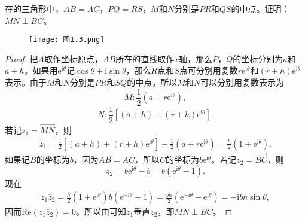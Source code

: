 \documentclass[../../main.tex]{subfiles}
\begin{document}
\begin{example}
在的三角形中，\(AB = AC\)，\(PQ = RS\)，\(M\)和\(N\)分别是\(PR\)和\(QS\)的中点。证明：\(MN \perp BC\)。
\begin{figure}[H]
\centering
\texttt{[image: 图1.3.png]}
\caption{}
\label{figure:图1.3}
\end{figure}
\end{example}
\begin{proof}
把\(A\)取作坐标原点，\(AB\)所在的直线取作\(x\)轴，那么\(P\)，\(Q\)的坐标分别为\(a\)和\(a + h\)。如果用\(\mathrm{e}^{\mathrm{i}\theta}\)记\(\cos\theta + \mathrm{i}\sin\theta\)，那么\(R\)点和\(S\)点可分别用复数\(r\mathrm{e}^{\mathrm{i}\theta}\)和\((r + h)\mathrm{e}^{\mathrm{i}\theta}\)表示。由于\(M\)和\(N\)分别是\(PR\)和\(SQ\)的中点，所以\(M\)和\(N\)可以分别用复数表示为
\[
M: \frac{1}{2}(a + r\mathrm{e}^{\mathrm{i}\theta}),
\]
\[
N: \frac{1}{2}[(a + h) + (r + h)\mathrm{e}^{\mathrm{i}\theta}].
\]
若记\(z_1 = \overrightarrow{MN}\)，则
\[
\begin{split}
z_1 = \frac{1}{2}[(a + h) + (r + h)\mathrm{e}^{\mathrm{i}\theta}] - \frac{1}{2}(a + r\mathrm{e}^{\mathrm{i}\theta}) = \frac{h}{2}(1 + \mathrm{e}^{\mathrm{i}\theta}).
\end{split}
\]
如果记\(B\)的坐标为\(b\)，因为\(AB = AC\)，所以\(C\)的坐标为\(b\mathrm{e}^{\mathrm{i}\theta}\)。若记\(z_2 = \overrightarrow{BC}\)，则
\[
z_2 = b\mathrm{e}^{\mathrm{i}\theta} - b = b(\mathrm{e}^{\mathrm{i}\theta} - 1).
\]
现在
\[
\begin{split}
z_1\bar{z}_2 = \frac{h}{2}(1 + \mathrm{e}^{\mathrm{i}\theta})b(\mathrm{e}^{-\mathrm{i}\theta} - 1) = \frac{bh}{2}(\mathrm{e}^{-\mathrm{i}\theta} - \mathrm{e}^{\mathrm{i}\theta}) = -\mathrm{i}bh\sin\theta,
\end{split}
\]
因而\(\mathrm{Re}(z_1\bar{z}_2) = 0\)。所以由可知\(z_1\)垂直\(z_2\)，即\(MN \perp BC\)。 

\end{proof}
\end{document}
